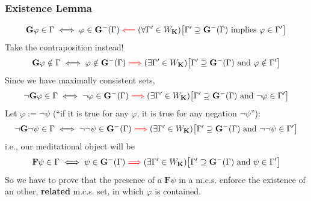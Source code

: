 \documentclass[xcolor=x11names]{beamer}
\newcommand{\cemph}[1]{\textcolor{red}{#1}}
\renewcommand{\emph}[1]{\textbf{#1}}
\newcommand{\FD}{\mathbf F}
\newcommand{\FB}{\mathbf G}
\newcommand{\forallin}[2]{(\forall #1 \in #2)}
\newcommand{\existsin}[2]{(\exists #1 \in #2)}
\begin{document}


\begin{frame}
\frametitle{Existence Lemma}

\[\FB \varphi \in \Gamma  \iff \varphi \in \FB^-(\Gamma) \mathrel{\cemph{\Longleftarrow}} \forallin {\Gamma'}{W_\mathbf K} \big[\Gamma' \supseteq \FB^-(\Gamma) \textup{ implies } \varphi \in \Gamma' \big]\]
Take the contraposition instead!
\[\FB \varphi \notin \Gamma  \iff \varphi \notin \FB^-(\Gamma) \mathrel{\cemph{\Longrightarrow}} \existsin {\Gamma'}{W_\mathbf K} \big[\Gamma' \supseteq \FB^-(\Gamma) \textup{ and } \varphi \notin \Gamma' \big]\]
Since we have maximally consistent sets,
\[\lnot \FB \varphi \in \Gamma  \iff  \lnot\varphi \in \FB^-(\Gamma) \mathrel{\cemph{\Longrightarrow}} \existsin {\Gamma'}{W_\mathbf K} \big[\Gamma' \supseteq \FB^-(\Gamma) \textup{ and } \lnot \varphi \in \Gamma' \big]\]
Let $\varphi :=\lnot \psi$ (``if it is true for any $\varphi$, it is true for any negation $\lnot \psi$''):
\[\lnot \FB \lnot \psi \in \Gamma  \iff  \lnot\lnot \psi \in \FB^-(\Gamma) \mathrel{\cemph{\Longrightarrow}} \existsin {\Gamma'}{W_\mathbf K} \big[\Gamma' \supseteq \FB^-(\Gamma) \textup{ and } \lnot \lnot \psi \in \Gamma' \big]\]
i.e., our meditational object will be
\[\FD \psi \in \Gamma  \iff  \psi \in \FB^-(\Gamma) \mathrel{\cemph{\Longrightarrow}} \existsin {\Gamma'}{W_\mathbf K} \big[\Gamma' \supseteq \FB^-(\Gamma) \textup{ and } \psi \in \Gamma' \big]\]
So we have to prove that the presence of a $\FD\psi$ in a m.c.s. enforce the existence of an other, \emph{related} m.c.s. set, in which $\varphi$ is contained.
\end{frame}

\end{document}
